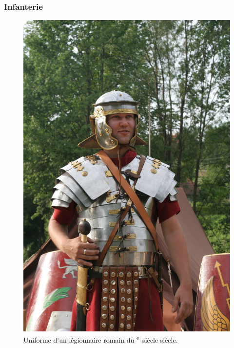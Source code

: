 \documentclass{article}
\newcommand{\cRM}[1]{\MakeUppercase{\romannumeral #1}}  %
\newcommand{\siecle}[1]{\cRM{#1}\textsuperscript{e}~siècle}
\begin{document}
\subsubsection{Infanterie}
\begin{figure}[H]
	\begin{centering}
	\includegraphics[width=0.42\paperwidth]{../ressources/Roman_soldier}
	\caption{Uniforme d'un légionnaire romain du \siecle{1} siècle. \cite{infantery}}
	\end{centering}
\end{figure}
\end{document}
